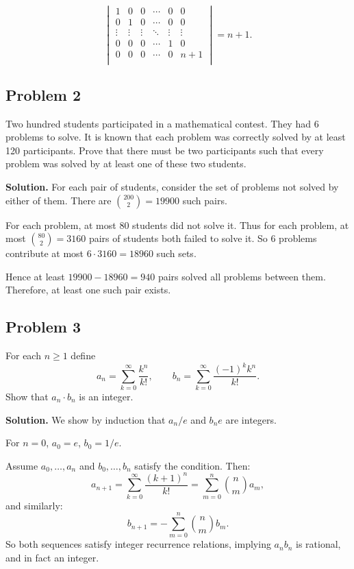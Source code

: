 \documentclass{article}
\begin{document}
\[
\begin{vmatrix}
1 & 0 & 0 & \cdots & 0 & 0 \\
0 & 1 & 0 & \cdots & 0 & 0 \\
\vdots & \vdots & \vdots & \ddots & \vdots & \vdots \\
0 & 0 & 0 & \cdots & 1 & 0 \\
0 & 0 & 0 & \cdots & 0 & n+1 \\
\end{vmatrix} = n + 1.
\]

\subsection*{Problem 2}

Two hundred students participated in a mathematical contest.
They had 6 problems to solve. It is known that each problem was correctly solved by at least 120 participants.
Prove that there must be two participants such that every problem was solved by
at least one of these two students.

\textbf{Solution.}
For each pair of students, consider the set of problems not solved by either of them. There are $\binom{200}{2} = 19900$ such pairs.

For each problem, at most 80 students did not solve it. Thus for each problem, at most $\binom{80}{2} = 3160$ pairs of students both failed to solve it. So 6 problems contribute at most $6 \cdot 3160 = 18960$ such sets.

Hence at least $19900 - 18960 = 940$ pairs solved all problems between them. Therefore, at least one such pair exists.

\subsection*{Problem 3}

For each $n \ge 1$ define
\[
    a_n = \sum_{k=0}^\infty \frac{k^n}{k!}, \qquad
    b_n = \sum_{k=0}^\infty \frac{(-1)^k k^n}{k!}.
\]
Show that $a_n \cdot b_n$ is an integer.

\textbf{Solution.}
We show by induction that $a_n/e$ and $b_n e$ are integers.

For $n = 0$, $a_0 = e$, $b_0 = 1/e$.

Assume $a_0, \dotsc, a_n$ and $b_0, \dotsc, b_n$ satisfy the condition. Then:
\[
a_{n+1} = \sum_{k=0}^\infty \frac{(k+1)^n}{k!} = \sum_{m=0}^n \binom{n}{m} a_m,
\]
and similarly:
\[
b_{n+1} = -\sum_{m=0}^n \binom{n}{m} b_m.
\]
So both sequences satisfy integer recurrence relations, implying $a_n b_n$ is rational, and in fact an integer.
\end{document}
